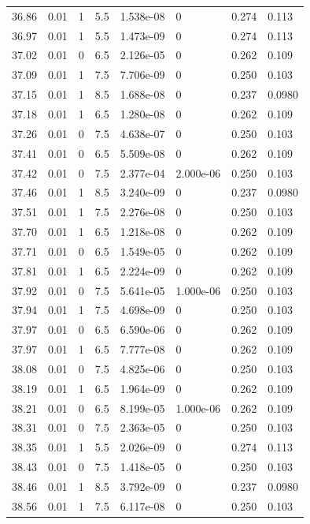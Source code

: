 \documentclass[preview]{standalone}
\begin{document}
{{{{{{{{{{{{\begin{tabular}{L{1.2cm}C{1.2cm} C{0.3cm}C{0.5cm} C{1.4cm}C{1.4cm} C{1.4cm}C{1.4cm}}
  36.86  &  0.01  & 1     & 5.5 &  1.538e-08  & 0  & 0.274 &  0.113   \\ 
  36.97  &  0.01  & 1     & 5.5 &  1.473e-09  & 0  & 0.274 &  0.113   \\ 
  37.02  &  0.01  & 0     & 6.5 &  2.126e-05  & 0  & 0.262 &  0.109   \\ 
  37.09  &  0.01  & 1     & 7.5 &  7.706e-09  & 0  & 0.250 &  0.103   \\ 
  37.15  &  0.01  & 1     & 8.5 &  1.688e-08  & 0  & 0.237 &  0.0980   \\ 
  37.18  &  0.01  & 1     & 6.5 &  1.280e-08  & 0  & 0.262 &  0.109   \\ 
  37.26  &  0.01  & 0     & 7.5 &  4.638e-07  & 0  & 0.250 &  0.103   \\ 
  37.41  &  0.01  & 0     & 6.5 &  5.509e-08  & 0  & 0.262 &  0.109   \\ 
  37.42  &  0.01  & 0     & 7.5 &  2.377e-04  & 2.000e-06  & 0.250 &  0.103   \\ 
  37.46  &  0.01  & 1     & 8.5 &  3.240e-09  & 0  & 0.237 &  0.0980   \\ 
  37.51  &  0.01  & 1     & 7.5 &  2.276e-08  & 0  & 0.250 &  0.103   \\ 
  37.70  &  0.01  & 1     & 6.5 &  1.218e-08  & 0  & 0.262 &  0.109   \\ 
  37.71  &  0.01  & 0     & 6.5 &  1.549e-05  & 0  & 0.262 &  0.109   \\ 
  37.81  &  0.01  & 1     & 6.5 &  2.224e-09  & 0  & 0.262 &  0.109   \\ 
  37.92  &  0.01  & 0     & 7.5 &  5.641e-05  & 1.000e-06  & 0.250 &  0.103   \\ 
  37.94  &  0.01  & 1     & 7.5 &  4.698e-09  & 0  & 0.250 &  0.103   \\ 
  37.97  &  0.01  & 0     & 6.5 &  6.590e-06  & 0  & 0.262 &  0.109   \\ 
  37.97  &  0.01  & 1     & 6.5 &  7.777e-08  & 0  & 0.262 &  0.109   \\ 
  38.08  &  0.01  & 0     & 7.5 &  4.825e-06  & 0  & 0.250 &  0.103   \\ 
  38.19  &  0.01  & 1     & 6.5 &  1.964e-09  & 0  & 0.262 &  0.109   \\ 
  38.21  &  0.01  & 0     & 6.5 &  8.199e-05  & 1.000e-06  & 0.262 &  0.109   \\ 
  38.31  &  0.01  & 0     & 7.5 &  2.363e-05  & 0  & 0.250 &  0.103   \\ 
  38.35  &  0.01  & 1     & 5.5 &  2.026e-09  & 0  & 0.274 &  0.113   \\ 
  38.43  &  0.01  & 0     & 7.5 &  1.418e-05  & 0  & 0.250 &  0.103   \\ 
  38.46  &  0.01  & 1     & 8.5 &  3.792e-09  & 0  & 0.237 &  0.0980   \\ 
  38.56  &  0.01  & 1     & 7.5 &  6.117e-08  & 0  & 0.250 &  0.103   \\ 
\hline 
\end{tabular} 

}}}}}}}}}}}}
\end{document}
